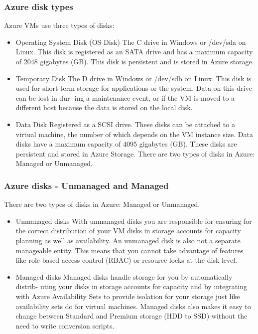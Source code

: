 \documentclass[12pt]{article}
\begin{document}
\subsubsection{Azure disk types}
Azure VMs use three types of disks:
\begin{itemize}
    
    \item Operating System Disk (OS Disk) The C drive in Windows or /dev/sda on Linux. This disk is registered as an SATA drive and has a maximum capacity of 2048 gigabytes (GB). This disk is persistent and is stored in Azure storage.
    \item Temporary Disk The D drive in Windows or /dev/sdb on Linux. This disk is used for short term storage for applications or the system. Data on this drive can be lost in dur- ing a maintenance event, or if the VM is moved to a different host because the data is stored on the local disk.
    \item Data Disk Registered as a SCSI drive. These disks can be attached to a virtual machine, the number of which depends on the VM instance size. Data disks have a maximum capacity of 4095 gigabytes (GB). These disks are persistent and stored in Azure Storage.
There are two types of disks in Azure: Managed or Unmanaged.
\end{itemize}

\subsubsection{Azure disks - Unmanaged and Managed}
There are two types of disks in Azure: Managed or Unmanaged.
\begin{itemize}
    \item Unmanaged disks With unmanaged disks you are responsible for ensuring for the correct distribution of your VM disks in storage accounts for capacity planning as well as availability. An unmanaged disk is also not a separate manageable entity. This means that you cannot take advantage of features like role based access control (RBAC) or resource locks at the disk level.
    \item Managed disks Managed disks handle storage for you by automatically distrib- uting your disks in storage accounts for capacity and by integrating with Azure Availability Sets to provide isolation for your storage just like availability sets do for virtual machines. Managed disks also makes it easy to change between Standard and Premium storage (HDD to SSD) without the need to write conversion scripts.
\end{itemize}
\end{document}

